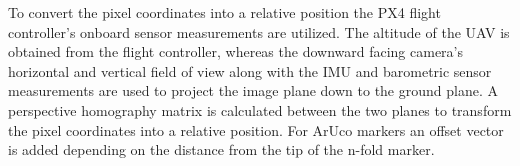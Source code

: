 \documentclass[conference]{IEEEtran}
\begin{document}
To convert the pixel coordinates into a relative position
the PX4 flight controller's onboard sensor measurements are utilized.
The altitude of the UAV is obtained from the flight controller,
whereas the downward facing camera's horizontal and vertical field of view along with the IMU and barometric sensor measurements are used to project
the image plane down to the ground plane. A perspective homography
matrix is calculated between the two planes to transform the
pixel coordinates into a relative position. For ArUco
markers an offset vector is added depending on the distance 
from the tip of the n-fold marker.

%
%
%
%
%
%
\end{document}
